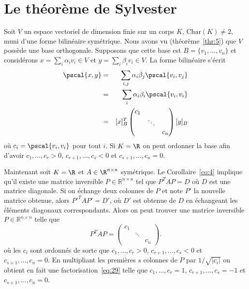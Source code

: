 \section{Le théorème de Sylvester}
\label{sec:le-theoreme-de}




Soit $V$ un espace vectoriel de dimension finie sur un corps $K$, $\mathrm{Char}(K) \neq 2$, muni d'une forme bilinéaire symétrique. Nous avons vu (théorème~\ref{thr:5}) que $V$ possède une base orthogonale. Supposons que cette base est $B = \{v_1,\dots,v_n\}$ et considérons $x = \sum_i \alpha_i v_i \in V$ et $y = \sum_i \beta_i v_i \in V$. La forme bilinéaire  s'écrit 
\begin{eqnarray*}
  \pscal{x,y} & =  & \sum_{i, j} \alpha_i \beta_j \pscal{v_i,v_j} \\
              & = & \sum_i \alpha_i \beta_i \pscal{v_i,v_i} \\
               & = & [x]_B^T 
                    \begin{pmatrix}
                      c_1 & & \\
                                     & \ddots & \\
                                     & & c_n
                    \end{pmatrix} [y]_B
\end{eqnarray*}
où $c_i = \pscal{v_i,v_i}$ pour tout $i$. 
Si $K = \R$ on peut ordonner la base afin d'avoir $c_1,\dots,c_r>0$, $c_{r+1},\dots,c_s < 0$ et $c_{s+1},\dots,c_n = 0$.



Maintenant soit $K = \R$  et $A \in \R^{n \times n}$ symétrique. Le Corollaire~\ref{co:4} implique qu'il existe une matrice inversible $P ∈ ℝ^{n \times n}$ tel que $P^T A P = D$ où $D$ est une matrice diagonale. Si on échange deux colonnes de $P$ et note $P'$ la nouvelle matrice obtenue, alors $P'^T A P' = D'$, où $D'$ est obtenue de $D$ en échangeant les éléments diagonaux correspondants. Alors on peut trouver une matrice inversible $P ∈ ℝ^{n ×n}$ telle que 
\begin{equation}
  \label{eq:29}
  P^T A {P} =
    \begin{pmatrix}
      c_1\\
      & \ddots \\
      && c_n
    \end{pmatrix}. 
\end{equation}
où les  $c_i$ sont ordonnés de sorte que  $c_1,\dots, c_r >0$, $c_{r+1},\dots ,c_s<0$ et $c_{s+1},\dots , c_n = 0$. En multipliant les premières $s$ colonnes de $P$ par $1/ \sqrt{|c_i|}$ on obtient en fait une factorisation~\eqref{eq:29} telle que 
 $c_1,\dots, c_r =1$, $c_{r+1},\dots ,c_s=-1$ et $c_{s+1},\dots , c_n = 0$. 

